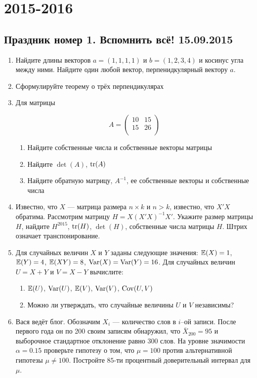 \documentclass[12pt, a4paper]{article}\usepackage[]{graphicx}\usepackage[]{color}
\begin{document}
\section{2015-2016}

\subsection{Праздник номер 1. Вспомнить всё! 15.09.2015}

\begin{enumerate}
\item Найдите длины векторов $a=(1,1,1,1)$ и $b=(1,2,3,4)$ и косинус угла между ними. Найдите один любой вектор, перпенидкулярный вектору $a$.
\item Сформулируйте теорему о трёх перпендикулярах
\item Для матрицы

\[
A=\begin{pmatrix}
10 & 15 \\
15 & 26 \\
\end{pmatrix}
\]

\begin{enumerate}
\item Найдите собственные числа и собственные векторы матрицы
\item Найдите $\det (A)$, $\operatorname{tr}(A)$
\item Найдите обратную матрицу, $A^{-1}$, ее собственные векторы и собственные числа
\end{enumerate}

\item Известно, что $X$ — матрица размера $n \times k$ и $n>k$, известно, что $X'X$ обратима. Рассмотрим матрицу $H=X(X'X)^{-1}X'$. Укажите размер матрицы $H$, найдите $H^{2015}$, $\operatorname{tr}(H)$, $\det(H)$, собственные числа матрицы $H$. Штрих означает транспонирование.

\item Для случайных величин $X$ и $Y$ заданы следующие значения: $\mathbb{E}(X)=1$, $\mathbb{E}(Y)=4$, $\mathbb{E}(XY)=8$, $\operatorname{Var}(X)=\operatorname{Var}(Y)=16$. Для случайных величин $U=X+Y$ и $V=X-Y$ вычислите:
\begin{enumerate}
\item $\mathbb{E}(U)$, $\operatorname{Var}(U)$, $\mathbb{E}(V)$, $\operatorname{Var}(V)$, $\operatorname{Cov}(U,V)$
\item Можно ли утверждать, что случайные величины $U$ и $V$ независимы?
\end{enumerate}

\item Вася ведёт блог. Обозначим $X_i$ — количество слов в $i$--ой записи. После первого года он по 200 своим записям обнаружил, что $\bar{X}_{200}=95$ и выборочное стандартное отклонение равно $300$ слов. На уровне значимости $\alpha=0.15$ проверьте гипотезу о том, что $\mu=100$ против альтернативной гипотезы $\mu\neq 100$. Постройте $85$-ти процентный доверительный интервал для $\mu$.


\end{enumerate}
\end{document}
